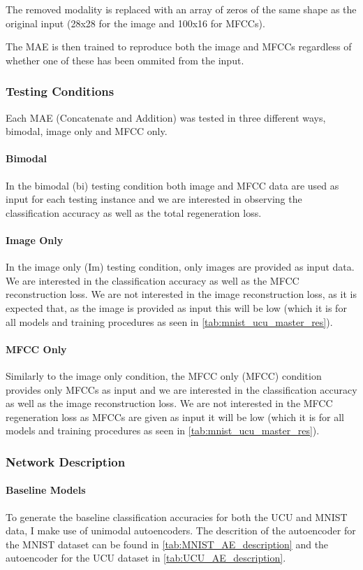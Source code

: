 The removed modality is replaced with an array of zeros of the same shape as the original input (28x28 for the image and 100x16 for MFCCs).

The MAE is then trained to reproduce both the image and MFCCs regardless of whether one of these has been ommited from the input.

\subsubsection{Testing Conditions}
Each MAE (Concatenate and Addition) was tested in three different ways, bimodal, image only and MFCC only.

\paragraph{Bimodal}
In the bimodal (bi) testing condition both image and MFCC data are used as input for each testing instance and we are interested in observing the classification accuracy as well as the total regeneration loss.

\paragraph{Image Only}
In the image only (Im) testing condition, only images are provided as input data. We are interested in the classification accuracy as well as the MFCC reconstruction loss. We are not interested in the image reconstruction loss, as it is expected that, as the image is provided as input this will be low (which it is for all models and training procedures as seen in \autoref{tab:mnist_ucu_master_res}).  

\paragraph{MFCC Only}
Similarly to the image only condition, the MFCC only (MFCC) condition provides only MFCCs as input and we are interested in the classification accuracy as well as the image reconstruction loss. We are not interested in the MFCC regeneration loss as MFCCs are given as input it will be low (which it is for all models and training procedures as seen in \autoref{tab:mnist_ucu_master_res}).  

\subsubsection{Network Description}
\paragraph{Baseline Models}
To generate the baseline classification accuracies for both the UCU and MNIST data, I make use of unimodal autoencoders. The descrition of the autoencoder for the MNIST dataset can be found in \autoref{tab:MNIST_AE_description} and the autoencoder for the UCU dataset in \autoref{tab:UCU_AE_description}.

